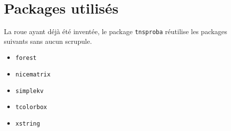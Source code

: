 \documentclass[12pt,a4paper]{article}
\begin{document}
\section{Packages utilisés}

La roue ayant déjà été inventée, le package \verb#tnsproba# réutilise les packages suivants sans aucun scrupule.

\begin{multicols}{4}
    \begin{itemize}
        \item \verb#forest#
        \item \verb#nicematrix#
        \item \verb#simplekv#
        \item \verb#tcolorbox#
        \item \verb#xstring#
    \end{itemize}
\end{multicols}
\end{document}

